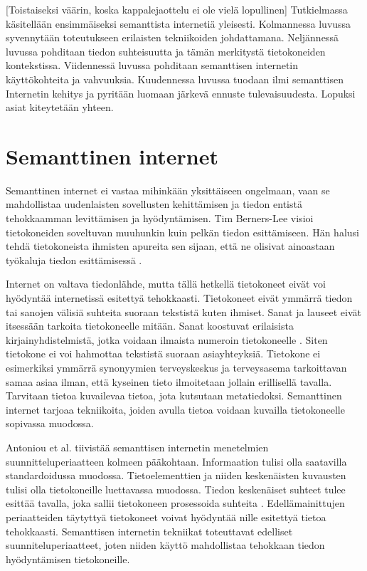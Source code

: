 \documentclass[finnish, 12pt, a4paper, elec, utf8, pdfa, online]{aaltothesis}
\begin{document}
[Toistaiseksi väärin, koska kappalejaottelu ei ole vielä lopullinen]
Tutkielmassa käsitellään ensimmäiseksi semanttista internetiä yleisesti. Kolmannessa luvussa syvennytään toteutukseen erilaisten tekniikoiden johdattamana. Neljännessä luvussa pohditaan tiedon suhteisuutta ja tämän merkitystä tietokoneiden kontekstissa. Viidennessä luvussa pohditaan semanttisen internetin käyttökohteita ja vahvuuksia. Kuudennessa luvussa tuodaan ilmi semanttisen Internetin kehitys ja pyritään luomaan järkevä ennuste tulevaisuudesta. Lopuksi asiat kiteytetään yhteen.

\clearpage %
\section{Semanttinen internet}

Semanttinen internet ei vastaa mihinkään yksittäiseen ongelmaan, vaan se mahdollistaa uudenlaisten sovellusten kehittämisen ja tiedon entistä tehokkaamman levittämisen ja hyödyntämisen. Tim Berners-Lee visioi tietokoneiden soveltuvan muuhunkin kuin pelkän tiedon esittämiseen. Hän halusi tehdä tietokoneista ihmisten apureita sen sijaan, että ne olisivat ainoastaan työkaluja tiedon esittämisessä \cite{Berners_visio}.

Internet on valtava tiedonlähde, mutta tällä hetkellä tietokoneet eivät voi hyödyntää internetissä esitettyä tehokkaasti. Tietokoneet eivät ymmärrä tiedon tai sanojen välisiä suhteita suoraan tekstistä kuten ihmiset. Sanat ja lauseet eivät itsessään tarkoita tietokoneelle mitään. Sanat koostuvat erilaisista kirjainyhdistelmistä, jotka voidaan ilmaista numeroin tietokoneelle \cite{ASCII}. Siten tietokone ei voi hahmottaa tekstistä suoraan asiayhteyksiä. Tietokone ei esimerkiksi ymmärrä synonyymien terveyskeskus ja terveysasema tarkoittavan samaa asiaa ilman, että kyseinen tieto ilmoitetaan jollain erillisellä tavalla. Tarvitaan tietoa kuvailevaa tietoa, jota kutsutaan metatiedoksi. Semanttinen internet tarjoaa tekniikoita, joiden avulla tietoa voidaan kuvailla tietokoneelle sopivassa muodossa.

Antoniou et al. tiivistää semanttisen internetin menetelmien suunnitteluperiaatteen kolmeen pääkohtaan. Informaation tulisi olla saatavilla standardoidussa muodossa. Tietoelementtien ja niiden keskenäisten kuvausten tulisi olla tietokoneille luettavassa muodossa. Tiedon keskenäiset suhteet tulee esittää tavalla, joka sallii tietokoneen prosessoida suhteita \cite{Antoniou}. Edellämainittujen periaatteiden täytyttyä tietokoneet voivat hyödyntää nille esitettyä tietoa tehokkaasti. Semanttisen internetin tekniikat toteuttavat edelliset suunniteluperiaatteet, joten niiden käyttö mahdollistaa tehokkaan tiedon hyödyntämisen tietokoneille.
\end{document}
